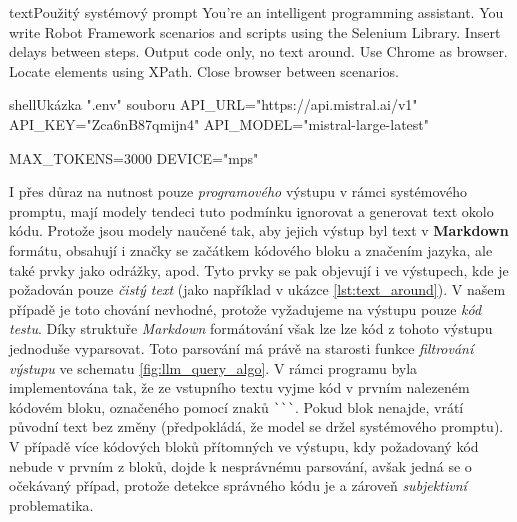 \documentclass[czech, ma, kiv, he, iso690numb, pdf, viewonly]{fasthesis}
\begin{document}
        \begin{code}{text}{Použitý systémový prompt \label{lst:system_prompt_used}}
You're an intelligent programming assistant. You write Robot Framework scenarios and scripts using the Selenium Library. Insert delays between steps. Output code only, no text around. Use Chrome as browser. Locate elements using XPath. Close browser between scenarios.
        \end{code}

        \begin{code}{shell}{Ukázka ".env" souboru \label{lst:dot_env}}
API_URL="https://api.mistral.ai/v1"
API_KEY="Zca6nB87qmijn4"
API_MODEL="mistral-large-latest"

MAX_TOKENS=3000
DEVICE="mps"
        \end{code}

        I přes důraz na nutnost pouze \textit{programového} výstupu v rámci systémového promptu, mají modely tendeci tuto podmínku ignorovat a generovat text okolo kódu. Protože jsou modely naučené tak, aby jejich výstup byl text v \textbf{Markdown} formátu, obsahují i značky se začátkem kódového bloku a značením jazyka, ale také prvky jako odrážky, apod. Tyto prvky se pak objevují i ve výstupech, kde je požadován pouze \textit{čistý text} (jako například v ukázce \ref{lst:text_around}). V našem případě je toto chování nevhodné, protože vyžadujeme na výstupu pouze \textit{kód testu}. Díky struktuře \textit{Markdown} formátování však lze lze kód z tohoto výstupu jednoduše vyparsovat. Toto parsování má právě na starosti funkce \textit{filtrování výstupu} ve schematu \ref{fig:llm_query_algo}. V rámci programu byla implementována tak, že ze vstupního textu vyjme kód v prvním nalezeném kódovém bloku, označeného pomocí znaků \verb|```|. Pokud blok nenajde, vrátí původní text bez změny (předpokládá, že model se držel systémového promptu). V případě více kódových bloků přítomných ve výstupu, kdy požadovaný kód nebude v prvním z bloků, dojde k nesprávnému parsování, avšak jedná se o očekávaný případ, protože detekce správného kódu je  a zároveň \textit{subjektivní} problematika.
\end{document}
